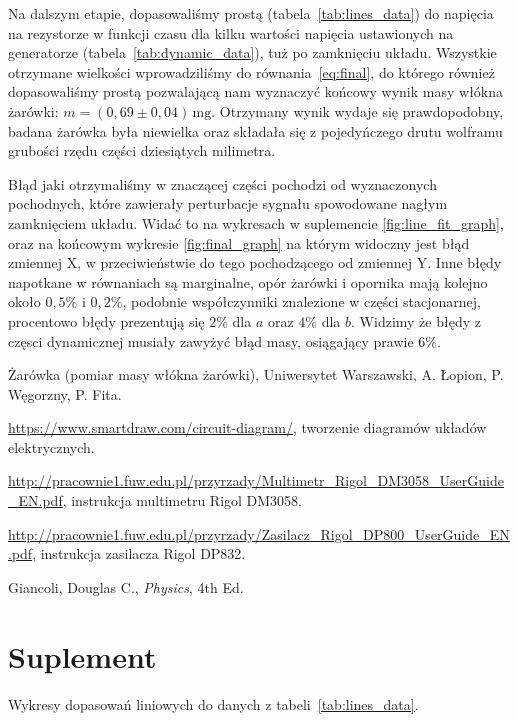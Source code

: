 \documentclass[12pt]{article}
\begin{document}
Na dalszym etapie, dopasowaliśmy prostą (tabela~\ref{tab:lines_data}) do napięcia na rezystorze w funkcji czasu dla kilku wartości napięcia ustawionych na generatorze (tabela~\ref{tab:dynamic_data}), tuż po zamknięciu układu. Wszystkie otrzymane wielkości wprowadziliśmy do równania~\eqref{eq:final}, do którego również dopasowaliśmy prostą pozwalającą nam wyznaczyć końcowy wynik masy włókna żarówki: $m=(0{,}69\pm0{,}04)\,\mathrm{mg}$. Otrzymany wynik wydaje się prawdopodobny, badana żarówka była niewielka oraz składała się z pojedyńczego drutu wolframu grubości rzędu części dziesiątych milimetra.

Błąd jaki otrzymaliśmy w znaczącej części pochodzi od wyznaczonych pochodnych, które zawierały perturbacje sygnału spowodowane nagłym zamknięciem układu. Widać to na wykresach w suplemencie \ref{fig:line_fit_graph}, oraz na końcowym wykresie \ref{fig:final_graph} na którym widoczny jest błąd zmiennej X, w przeciwieństwie do tego pochodzącego od zmiennej Y. Inne błędy napotkane w równaniach są marginalne, opór żarówki i opornika mają kolejno około $0{,}5 \%$ i $0{,}2 \%$, podobnie współczynniki znalezione w części stacjonarnej, procentowo błędy prezentują się $2\%$ dla $a$ oraz $4\%$ dla $b$. Widzimy że błędy z częsci dynamicznej musiały zawyżyć błąd masy, osiągający prawie $6\%$.


\newpage
\begin{thebibliography}{6}

Żarówka (pomiar masy włókna żarówki), Uniwersytet Warszawski, A. Łopion, P. Węgorzny, P. Fita.

\url{https://www.smartdraw.com/circuit-diagram/}, tworzenie diagramów układów elektrycznych.

\url{http://pracownie1.fuw.edu.pl/przyrzady/Multimetr_Rigol_DM3058_UserGuide_EN.pdf}, instrukcja multimetru Rigol DM3058.

\url{http://pracownie1.fuw.edu.pl/przyrzady/Zasilacz_Rigol_DP800_UserGuide_EN.pdf}, instrukcja zasilacza Rigol DP832.

Giancoli, Douglas C., \emph{Physics}, 4th Ed.

\end{thebibliography}

\newpage

\section{Suplement}
Wykresy dopasowań liniowych do danych z tabeli~\ref{tab:lines_data}.
\end{document}
